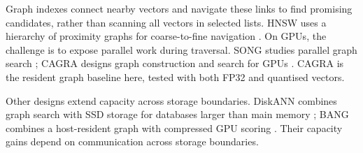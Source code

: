 Graph indexes connect nearby vectors and navigate these links to find
promising candidates, rather than scanning all vectors in selected lists.
HNSW uses a hierarchy of proximity graphs for coarse-to-fine navigation
\cite{hnsw}. On GPUs, the challenge is to expose parallel work during
traversal. SONG studies parallel graph search \cite{song}; CAGRA designs
graph construction and search for GPUs \cite{cagra}. CAGRA is the resident
graph baseline here, tested with both FP32 and quantised vectors.

Other designs extend capacity across storage boundaries. DiskANN combines
graph search with SSD storage for databases larger than main memory
\cite{diskann}; BANG combines a host-resident graph with compressed GPU
scoring \cite{bang}. Their capacity gains depend on communication across
storage boundaries.
